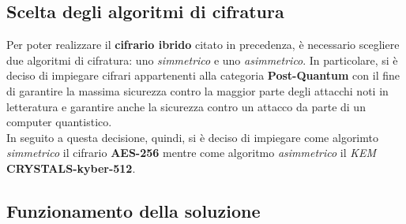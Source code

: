 \subsection{Scelta degli algoritmi di cifratura}
Per poter realizzare il \textbf{cifrario ibrido} citato in precedenza, è necessario scegliere due algoritmi di cifratura: uno \emph{simmetrico} e uno \emph{asimmetrico}. In particolare, si è deciso di impiegare cifrari appartenenti alla categoria \textbf{Post-Quantum} con il fine di garantire la massima sicurezza contro la maggior parte degli attacchi noti in letteratura e garantire anche la sicurezza contro un attacco da parte di un computer quantistico.\\
In seguito a questa decisione, quindi, si è deciso di impiegare come algorimto \emph{simmetrico} il cifrario \textbf{AES-256} mentre come algoritmo \emph{asimmetrico} il \emph{KEM} \textbf{CRYSTALS-kyber-512}.

\subsection{Funzionamento della soluzione}